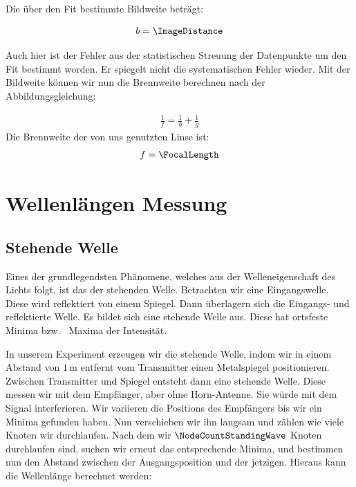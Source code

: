\documentclass[a4paper,10pt,twocolumn]{article}
\begin{document}
    
    Die über den Fit bestimmte Bildweite beträgt:
    
    \begin{align*}
        b = \ImageDistance
    \end{align*}

    Auch hier ist der Fehler aus der statistischen Streuung der Datenpunkte um den Fit bestimmt worden.
    Er spiegelt nicht die systematischen Fehler wieder.
    Mit der Bildweite können wir nun die Brennweite berechnen nach der Abbildungsgleichung:
    
    \begin{align}
        \label{eq:LensFormula}
        \frac{1}{f} = \frac{1}{b} + \frac{1}{g}
    \end{align}
    Die Brennweite der von uns genutzten Linse ist:
    \begin{align*}
        f = \FocalLength
    \end{align*}
    
    \section{Wellenlängen Messung}
    \subsection{Stehende Welle}
    
    Eines der grundlegendsten Phänomene, welches aus der Welleneigenschaft des Lichts folgt, ist das der stehenden Welle.
    Betrachten wir eine Eingangswelle.
    Diese wird reflektiert von einem Spiegel.
    Dann überlagern sich die Eingangs- und reflektierte Welle.
    Es bildet sich eine stehende Welle aus.
    Diese hat ortsfeste Minima bzw. \ Maxima der Intensität.
    
    In unserem Experiment erzeugen wir die stehende Welle, indem wir in einem Abstand von $1\, \mathrm{m}$ entfernt
    vom Transmitter einen Metalspiegel positionieren.
    Zwischen Transmitter und Spiegel entsteht dann eine stehende Welle.
    Diese messen wir mit dem Empfänger, aber ohne Horn-Antenne.
    Sie würde mit dem Signal interferieren.
    Wir variieren die Positions des Empfängers bis wir ein Minima gefunden haben.
    Nun verschieben wir ihn langsam und zählen wie viele Knoten wir durchlaufen.
    Nach dem wir $\NodeCountStandingWave$ Knoten durchlaufen sind, suchen wir erneut das entsprechende Minima, und 
    bestimmen nun den Abstand zwischen der Ausgangsposition und der jetzigen. 
    Hieraus kann die Wellenlänge berechnet werden:
    
\end{document}

